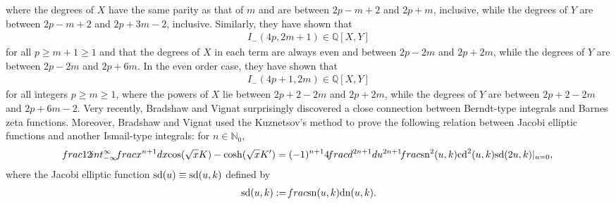 \documentclass[11pt]{article}
\def\N{\mathbb{N}}
\theoremstyle{plain}
\theoremstyle{definition}
\begin{document}
where the degrees of $X$ have the same parity as that of $m$ and are between $2p-m+2$ and $2p+m$, inclusive, while the degrees of $Y$ are between $2p-m+2$ and $2p+3m-2$, inclusive. Similarly, they have shown that
\begin{align*}
I_{-}(4p,2m+1)\in\mathbb{Q}[X,Y]
\end{align*}
for all $p\geq m+1\geq 1$ and that the degrees of $X$ in each term are always even and between $2p-2m$ and $2p+2m$, while the degrees of $Y$ are between $2p-2m$ and
$2p+6m$. In the even order case, they have shown that
\begin{align*}
I_{-}(4p+1,2m)\in\mathbb{Q}[X,Y]
\end{align*}
for all integers $p\geq m \geq 1$, where the powers of $X$  lie between $2p+2-2m$ and $2p+2m$, while the degrees of $Y$ are between $2p+2-2m$ and $2p+6m-2$. Very recently,  Bradshaw and Vignat  \cite[Cor. 2]{BV2024} surprisingly discovered a close connection between Berndt-type integrals and Barnes zeta functions. Moreover, Bradshaw and Vignat \cite[Cor. 5]{BV2024} used the Kuznetsov's method to prove the following relation between Jacobi elliptic functions and another Ismail-type integrals: for $n\in \N_0$,
\begin{align}\label{Ims-Kuz-1}
\frac1{2}\int_{-\infty}^\infty \frac{x^{n+1} dx}{\cos(\sqrt{x}K)-\cosh(\sqrt{x}K')}=(-1)^{n+1}4 \frac{d^{2n+1}}{du^{2n+1}} \frac{{\rm sn}^2 (u,k)}{{\rm cd}^2(u,k){\rm sd}(2u,k)}|_{u=0},
\end{align}
where the Jacobi elliptic function ${\rm sd}(u)\equiv {\rm sd}(u,k)$  defined by
\begin{align}\label{defin-sd}
	{\rm sd}(u,k):=\frac{{\rm sn}(u,k)}{{\rm dn}(u,k)}.
\end{align}
\end{document}
